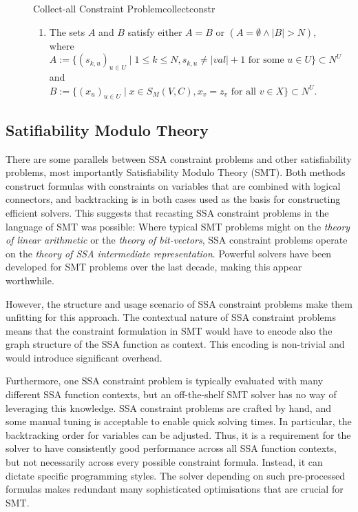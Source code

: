 \begin{figure}[p]
\begin{definition}{Collect-all Constraint Problem}{collectconstr}
\begin{enumerate}
              If there are any duplicates, they have to be of the form $(|val|+1,\dots,|val|+1)\in\mathbb N^U$.
        \item The sets $A$ and $B$ satisfy either $A=B$ or $(A=\emptyset\mathrel\land |B|>N)$, where\\
              $A:=\{(s_{k,u})_{u\in U}\mid 1\leq k\leq N, s_{k,u}\neq|val|+1\text{ for some }u\in U\}\subset N^U$ and\\
              $B:=\{(x_u)_{u\in U}\mid x\in S_M(V,C), x_v=z_v\text{ for all }v\in X\}\subset N^U$.
        \end{enumerate}
    \end{definition}
\end{figure}

\subsection{Satifiability Modulo Theory}

    There are some parallels between SSA constraint problems and other
    satisfiability problems, most importantly Satisfiability Modulo Theory
    (SMT).
    Both methods construct formulas with constraints on variables that are
    combined with logical connectors, and backtracking is in both cases used as
    the basis for constructing efficient solvers.
    This suggests that recasting SSA constraint problems in the language of SMT
    was possible:
    Where typical SMT problems might on the {\em theory of linear arithmetic} or
    the {\em theory of bit-vectors}, SSA constraint problems operate on the
    {\em theory of SSA intermediate representation}.
    Powerful solvers have been developed for SMT problems over the last decade,
    making this appear worthwhile.

    However, the structure and usage scenario of SSA constraint problems make
    them unfitting for this approach.
    The contextual nature of SSA constraint problems means that the constraint
    formulation in SMT would have to encode also the graph structure of the
    SSA function as context.
    This encoding is non-trivial and would introduce significant overhead.

    Furthermore, one SSA constraint problem is typically evaluated with many
    different SSA function contexts, but
    an off-the-shelf SMT solver has no way of leveraging this knowledge.
    SSA constraint problems are crafted by hand, and some manual tuning is
    acceptable to enable quick solving times.
    In particular, the backtracking order for variables can be adjusted.
    Thus, it is a requirement for the solver to have consistently good
    performance across all SSA function contexts, but not necessarily across
    every possible constraint formula.
    Instead, it can dictate specific programming styles.
    The solver depending on such pre-processed formulas makes redundant many
    sophisticated optimisations that are crucial for SMT.

